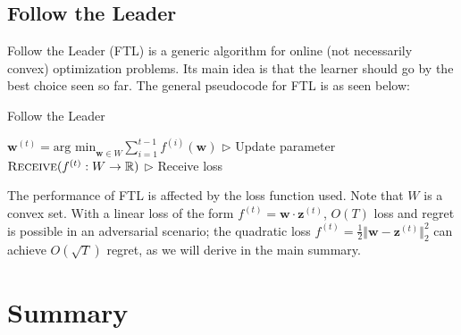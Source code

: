 \documentclass[11pt]{article}
\begin{document}
\subsection{Follow the Leader}
Follow the Leader (FTL) is a generic algorithm for online (not necessarily convex) optimization problems. Its main idea is that the learner should go by the best choice seen so far. The general pseudocode for FTL is as seen below:
\begin{algorithm}[H]
\caption{Follow the Leader}
\label{algo:FTL}
\begin{algorithmic}[1]
\vspace{5pt}
\STATE \qquad  $\boldsymbol{w}^{(t)}=\text{arg min}_{\boldsymbol{w}\in W} \sum_{i=1}^{t-1} f^{(i)} (\boldsymbol{w})$
\vspace{5pt} \hfill $\triangleright$ Update parameter
\STATE \qquad  $\textsc{Receive}(f^{(t)}:W \rightarrow \mathbb{R})$ \hfill $\triangleright$ Receive loss
\ENDFOR
\end{algorithmic}
\end{algorithm}
The performance of FTL is affected by the loss function used. Note that $W$ is a convex set. With a linear loss of the form $f^{(t)} = \boldsymbol{w} \cdot \boldsymbol{z}^{(t)}$, $O(T)$ loss and regret is possible in an adversarial scenario; the quadratic loss $f^{(t)}=\frac{1}{2}\Vert \boldsymbol{w}-\boldsymbol{z}^{(t)}\Vert^2_2$ can achieve $O(\sqrt{T})$ regret, as we will derive in the main summary. 
\section{Summary}
\end{document}
